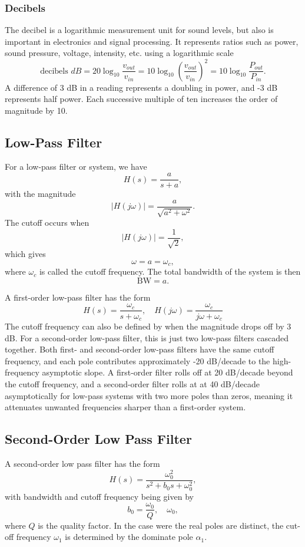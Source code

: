 \documentclass{article}
\begin{document}
\subsubsection{Decibels}
The decibel is a logarithmic measurement unit for sound levels, but also is important in electronics and signal processing. It represents ratios such as power, sound pressure, voltage, intensity, etc. using a logarithmic scale
\[
    \text{decibels } dB=20 \log_{10} \frac{v_{out}}{v_{in}}=10 \log_{10}\left( \frac{v_{out}}{v_{in}} \right)^2=10 \log_{10}\frac{P_{out}}{P_{in}}.
\]
A difference of 3 dB in a reading represents a doubling in power, and -3 dB represents half power. Each successive multiple of ten increases the order of magnitude by 10.

\subsection{Low-Pass Filter}
For a low-pass filter or system, we have
\[
    H(s)=\frac{a}{s+a},
\]
with the magnitude
\[
    \left| H(j\omega ) \right|=\frac{a}{\sqrt{a^2+\omega^2}}.
\]
The cutoff occurs when
\[
    \left| H(j\omega ) \right|=\frac{1}{\sqrt{2}},
\]
which gives
\[
    \omega =a=\omega _c,
\]
where $\omega _c$ is called the cutoff frequency. The total bandwidth of the system is then
\[
    \text{BW}=a.
\]

A first-order low-pass filter has the form
\[
    H(s)=\frac{\omega _c}{s+\omega _c},\quad H(j\omega )=\frac{\omega _c}{j\omega +\omega _c}
\]
The cutoff frequency can also be defined by when the magnitude drops off by 3 dB. For a second-order low-pass filter, this is just two low-pass filters cascaded together. Both first- and second-order low-pass filters have the same cutoff frequency, and each pole contributes approximately -20 dB/decade to the high-frequency asymptotic slope. A first-order filter rolls off at 20 dB/decade beyond the cutoff frequency, and a second-order filter rolls at at 40 dB/decade asymptotically for low-pass systems with two more poles than zeros, meaning it attenuates unwanted frequencies sharper than a first-order system.

\subsection{Second-Order Low Pass Filter}
A second-order low pass filter has the form
\[
    H(s)=\frac{\omega _0^2}{s^2+b_0s+\omega _0^2},
\]
with bandwidth and cutoff frequency being given by
\[
    b_0=\frac{\omega _0}{Q},\quad \omega _0,
\]
where $Q$ is the quality factor. In the case were the real poles are distinct, the cut-off frequency $\omega _1$ is determined by the dominate pole $\alpha _1$.
\end{document}
